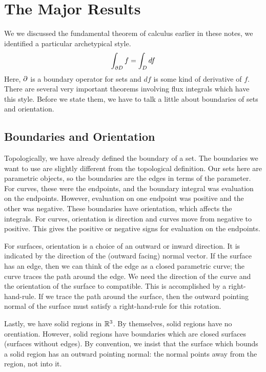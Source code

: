 \documentclass[fleqn,letterpaper]{report}
\begin{document}
\section{The Major Results}
\label{major-results}

We we discussed the fundamental theorem of calculus earlier
in these notes, we identified a particular archetypical style.
\begin{equation*}
\int_{\partial D} f = \int_D df
\end{equation*}
Here, $\partial$ is a boundary operator for sets and $df$ is some
kind of derivative of $f$. There are several very important
theorems involving flux integrals which have this style.
Before we state them, we have to talk a little about
boundaries of sets and orientation.

\subsection{Boundaries and Orientation}
\label{boundaries-orientation}

Topologically, we have already defined the boundary of a set.
The boundaries we want to use are slightly different
from the topological definition. Our sets here are parametric
objects, so the boundaries are the edges in terms of the
parameter. For curves, these were the endpoints, and the
boundary integral was evaluation on the endpoints. However,
evaluation on one endpoint was positive and the other was
negative. These boundaries have orientation, which affects
the integrals. For curves, orientation is direction and
curves move from negative to positive. This gives the
positive or negative signs for evaluation on the endpoints.

For surfaces, orientation is a choice of an outward or inward
direction. It is indicated by the direction of the (outward
facing) normal vector.
If the surface has an edge, then we can think of the edge as a
closed parametric curve; the curve traces the path around the
edge. We need the direction of the curve and the orientation
of the surface to compatible. This is accomplished by a
right-hand-rule. If we trace the path around the surface,
then the outward pointing normal of the surface must satisfy a
right-hand-rule for this rotation.

Lastly, we have solid regions in $\mathbb{R}^3$. By themselves,
solid regions have no orentiation. However, solid regions
have boundaries which are closed surfaces (surfaces without
edges). By convention, we insist that the surface which
bounds a solid region has an outward pointing normal: the
normal points away from the region, not into it.
\end{document}

